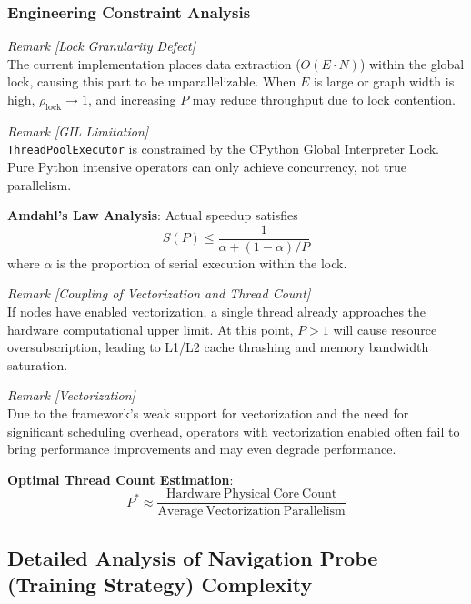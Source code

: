 \subsubsection{Engineering Constraint Analysis}
\label{sec:engineering_constraints}

\textit{Remark [Lock Granularity Defect]} \\
The current implementation places data extraction ($O(E \cdot N)$) within the global lock, causing this part to be unparallelizable. When $E$ is large or graph width is high, $\rho_{\mathrm{lock}} \to 1$, and increasing $P$ may reduce throughput due to lock contention.

\textit{Remark [GIL Limitation]} \\
\texttt{ThreadPoolExecutor} is constrained by the CPython Global Interpreter Lock. Pure Python intensive operators can only achieve concurrency, not true parallelism.

\textbf{Amdahl's Law Analysis}: Actual speedup satisfies
\begin{equation}
    S(P) \leq \frac{1}{\alpha + (1-\alpha)/P}
\end{equation}
where $\alpha$ is the proportion of serial execution within the lock.

\textit{Remark [Coupling of Vectorization and Thread Count]} \\
If nodes have enabled vectorization, a single thread already approaches the hardware computational upper limit. At this point, $P > 1$ will cause resource oversubscription, leading to L1/L2 cache thrashing and memory bandwidth saturation.

\textit{Remark [Vectorization]} \\
Due to the framework's weak support for vectorization and the need for significant scheduling overhead, operators with vectorization enabled often fail to bring performance improvements and may even degrade performance.

\textbf{Optimal Thread Count Estimation}:
\begin{equation}
    P^* \approx \frac{\mathrm{Hardware\ Physical\ Core\ Count}}{\mathrm{Average\ Vectorization\ Parallelism}}
\end{equation}

\subsection{Detailed Analysis of Navigation Probe (Training Strategy) Complexity}
\label{sec:detailed_analysis}

